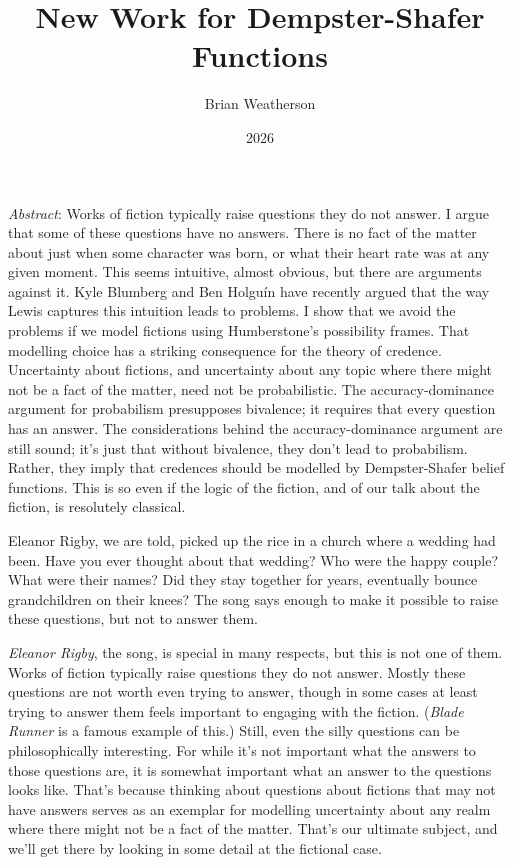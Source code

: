 \documentclass[
  11pt,
  letterpaper,
  DIV=11,
  numbers=noendperiod,
  twoside]{scrartcl}
\title{New Work for Dempster-Shafer Functions}
\author{Brian Weatherson}
\date{2026}
\renewenvironment{abstract}
 {\vspace{-1.25cm}
 \quotation\small\noindent\emph{Abstract}:}
 {\endquotation}
\renewenvironment{abstract}
 {\quotation\small\noindent\emph{Abstract}:}
 {\endquotation\vspace{-0.02cm}}
\begin{document}
\maketitle
\begin{abstract}
Works of fiction typically raise questions they do not answer. I argue
that some of these questions have no answers. There is no fact of the
matter about just when some character was born, or what their heart rate
was at any given moment. This seems intuitive, almost obvious, but there
are arguments against it. Kyle Blumberg and Ben Holguín have recently
argued that the way Lewis captures this intuition leads to problems. I
show that we avoid the problems if we model fictions using Humberstone's
possibility frames. That modelling choice has a striking consequence for
the theory of credence. Uncertainty about fictions, and uncertainty
about any topic where there might not be a fact of the matter, need not
be probabilistic. The accuracy-dominance argument for probabilism
presupposes bivalence; it requires that every question has an answer.
The considerations behind the accuracy-dominance argument are still
sound; it's just that without bivalence, they don't lead to probabilism.
Rather, they imply that credences should be modelled by Dempster-Shafer
belief functions. This is so even if the logic of the fiction, and of
our talk about the fiction, is resolutely classical.
\end{abstract}


Eleanor Rigby, we are told, picked up the rice in a church where a
wedding had been. Have you ever thought about that wedding? Who were the
happy couple? What were their names? Did they stay together for years,
eventually bounce grandchildren on their knees? The song says enough to
make it possible to raise these questions, but not to answer them.

\emph{Eleanor Rigby}, the song, is special in many respects, but this is
not one of them. Works of fiction typically raise questions they do not
answer. Mostly these questions are not worth even trying to answer,
though in some cases at least trying to answer them feels important to
engaging with the fiction. (\emph{Blade Runner} is a famous example of
this.) Still, even the silly questions can be philosophically
interesting. For while it's not important what the answers to those
questions are, it is somewhat important what an answer to the questions
looks like. That's because thinking about questions about fictions that
may not have answers serves as an exemplar for modelling uncertainty
about any realm where there might not be a fact of the matter. That's
our ultimate subject, and we'll get there by looking in some detail at
the fictional case.
\end{document}
